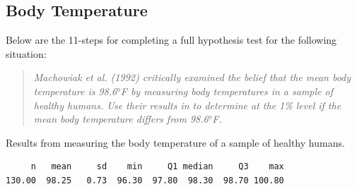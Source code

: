 \documentclass[10pt,openany]{book}\usepackage[]{graphicx}\usepackage[]{color}
\makeatletter
\newenvironment{kframe}{%
 \def\at@end@of@kframe{}%
 \ifinner\ifhmode%
  \def\at@end@of@kframe{\end{minipage}}%
  \begin{minipage}{\columnwidth}%
 \fi\fi%
 \def\FrameCommand##1{\hskip\@totalleftmargin \hskip-\fboxsep
 \colorbox{shadecolor}{##1}\hskip-\fboxsep
     \hskip-\linewidth \hskip-\@totalleftmargin \hskip\columnwidth}%
 \MakeFramed {\advance\hsize-\width
   \@totalleftmargin\z@ \linewidth\hsize
   \@setminipage}}%
 {\par\unskip\endMakeFramed%
 \at@end@of@kframe}
\newenvironment{knitrout}{}{} %
\makeatother
\begin{document}
\subsection{Body Temperature}
\vspace*{-4pt}
Below are the 11-steps  for completing a full hypothesis test for the following situation:
\vspace*{-8pt}
\begin{quote}
\textsl{Machowiak et al. (1992) critically examined the belief that the mean body temperature is 98.6$^{o}$F by measuring body temperatures in a sample of healthy humans. Use their results in  to determine at the 1\% level if the mean body temperature differs from 98.6$^{o}$F.}
\end{quote}

\vspace*{-4pt}
\begin{table}[h]
  \caption{Results from measuring the body temperature of a sample of healthy humans.}
  \label{tab:1ttemp}
  \vspace*{-12pt}
\begin{knitrout}
\color{fgcolor}\begin{kframe}
\begin{verbatim}
     n   mean     sd    min     Q1 median     Q3    max 
130.00  98.25   0.73  96.30  97.80  98.30  98.70 100.80 
\end{verbatim}
\end{kframe}
\end{knitrout}
\end{table}
\end{document}
